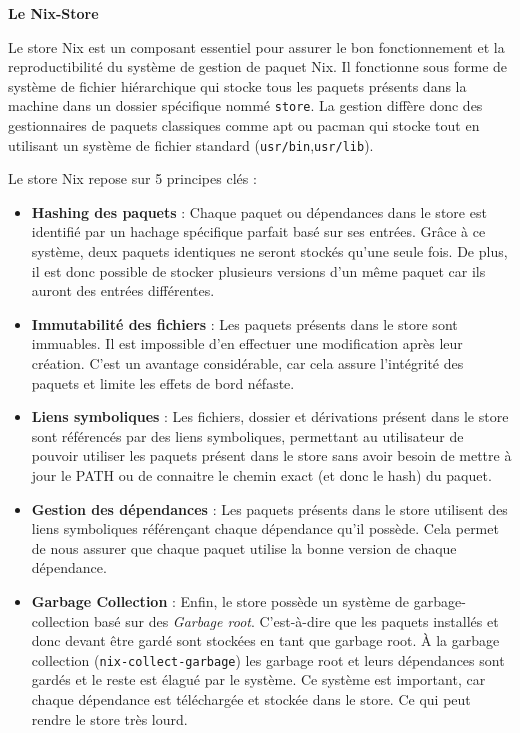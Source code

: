 \documentclass[a4paper,french,12pt, titlepage]{article}
\begin{document}
\textbf{Le Nix-Store}\newline

Le store Nix est un composant essentiel pour assurer le bon
fonctionnement et la reproductibilité du système de gestion de paquet
Nix. Il fonctionne sous forme de système de fichier hiérarchique qui
stocke tous les paquets présents dans la machine dans un dossier
spécifique nommé \texttt{store}. La gestion diffère donc des
gestionnaires de paquets classiques comme apt ou pacman qui stocke tout
en utilisant un système de fichier standard
(\texttt{usr/bin},\texttt{usr/lib}).\newline

Le store Nix repose sur 5 principes clés :

\begin{itemize}
\item
  \textbf{Hashing des paquets} : Chaque paquet ou dépendances dans le
  store est identifié par un hachage spécifique parfait basé sur ses
  entrées. Grâce à ce système, deux paquets identiques ne seront stockés
  qu'une seule fois. De plus, il est donc possible de stocker plusieurs
  versions d'un même paquet car ils auront des entrées différentes.
\item
  \textbf{Immutabilité des fichiers} : Les paquets présents dans le
  store sont immuables. Il est impossible d'en effectuer une
  modification après leur création. C'est un avantage considérable, car
  cela assure l'intégrité des paquets et limite les effets de bord
  néfaste.
\item
  \textbf{Liens symboliques} : Les fichiers, dossier et dérivations
  présent dans le store sont référencés par des liens symboliques,
  permettant au utilisateur de pouvoir utiliser les paquets présent dans
  le store sans avoir besoin de mettre à jour le PATH ou de connaitre le
  chemin exact (et donc le hash) du paquet.
\item
  \textbf{Gestion des dépendances} : Les paquets présents dans le store
  utilisent des liens symboliques référençant chaque dépendance qu'il
  possède. Cela permet de nous assurer que chaque paquet utilise la
  bonne version de chaque dépendance.
\item
  \textbf{Garbage Collection} : Enfin, le store possède un système de
  \gls{garbage-collection} basé sur des \emph{Garbage root}.
  C'est-à-dire que les paquets installés et donc devant être gardé sont
  stockées en tant que garbage root. À la garbage collection
  (\texttt{nix-collect-garbage}) les garbage root et leurs dépendances
  sont gardés et le reste est élagué par le système. Ce système est
  important, car chaque dépendance est téléchargée et stockée dans le
  store. Ce qui peut rendre le store très lourd.\newline
\end{itemize}
\end{document}
